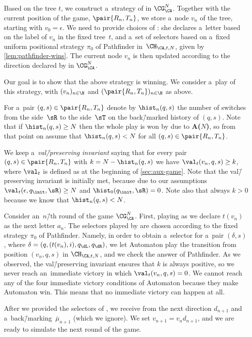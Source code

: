 \documentclass{lmcs}
\numberwithin{equation}{section}
\numberwithin{figure}{section}
\newcommand{\itemfont}[1]{\textbf{#1}}
\begin{document}
Based on the tree $t$, we construct a~strategy of \eve in $\CG^N_\CA$.
Together with the current position of the game, $\pair{R_n,T_n}$, we store a~node $v_n$ of the tree, starting with $v_0=\epsilon$.
We need to provide choices of \eve:
she declares a~letter based on the label of $v_n$ in the fixed tree~$t$,
and a~set of selectors based on a~fixed uniform positional strategy $\pi_0$ of Pathfinder in~$\CH_{\CA,t,N}$, given by \cref{lem:pathfinder-wins}.
The current node $v_n$ is then updated according to the direction declared by \adam in $\CG^N_\CA$.

Our goal is to show that the above strategy is winning.
We consider a~play of this strategy, with $(v_n)_{n\in\N}$ and $(\pair{R_n,T_n})_{n\in\N}$ as above.

For a~pair $(q,s)\in\pair{R_n,T_n}$ denote by $\hist_n(q,s)$ the number of switches from the side~$\sR$ to the side~$\sT$ on the back\=/marked history of $(q,s)$.
Note that if $\hist_n(q,s)\geq N$ then the whole play is won by \eve due to \itemfont{A($N$)}, so from that point on assume that $\hist_n(q,s)< N$ for all $(q,s)\in\pair{R_n,T_n}$.

We keep a~\emph{val\=/preserving invariant} saying that for every pair $(q,s)\in\pair{R_n,T_n}$ with $k=N-\hist_n(q,s)$ we have $\val_t(v_n,q,s)\geq k$, where $\val_t$ is defined as at the beginning of \cref{sec:aux-game}.
Note that the val\=/preserving invariant is initially met, because due to our assumptions $\val_t(\epsilon,q_\init,\sR)\geq N$ and $\hist_0(q_\init,\sR)=0$.
Note also that always $k>0$ because we know that $\hist_n(q,s)<N$.


Consider an~$n$\=/th round of the game $\CG^N_\CA$.
First, playing as \eve we declare $t(v_n)$ as the next letter $a_n$.
The selectors played by \eve are chosen according to the fixed strategy $\pi_0$ of Pathfinder.
Namely, in order to obtain a~selector for a~pair $(\delta,s)$, where $\delta=(q,(t(v_n),i),q_\dL,q_\dR)$,
we let Automaton play the transition from position $(v_n,q,s)$ in $\CH_{\CA,t,N}$, and we check the answer of Pathfinder.
As we observed, the val\=/preserving invariant ensures that $k$ is always positive, so we never reach an~immediate victory in which $\val_t(v_n,q,s)=0$.
We cannot reach any of the four immediate victory conditions of Automaton because they make Automaton win.
This means that no immediate victory can happen at all.

After we provided the selectors of \eve, we receive from \adam the next direction $d_{n+1}$ and a~back\=/marking~$\bar{\mu}_{n+1}$ (which we ignore).
We set $v_{n+1}=v_nd_{n+1}$, and we are ready to simulate the next round of the game.
\end{document}
